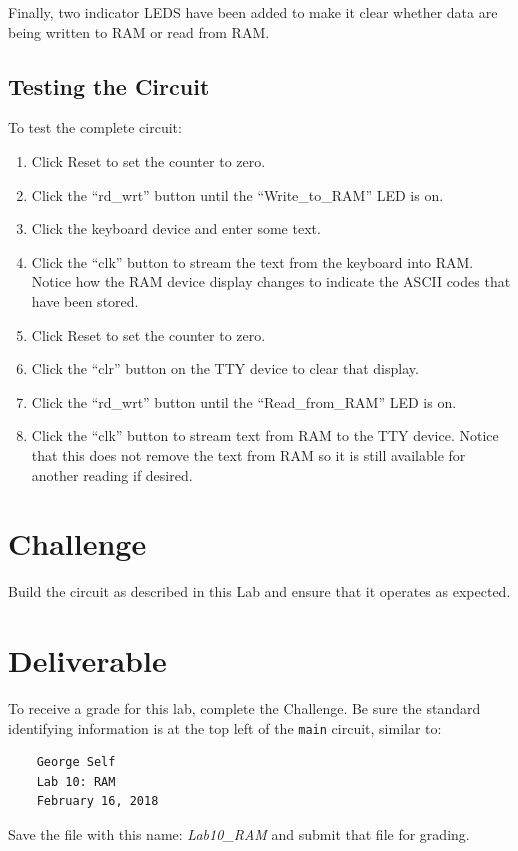 Finally, two indicator LEDS have been added to make it clear whether data are being written to RAM or read from RAM.

\subsection{Testing the Circuit}

To test the complete circuit:

\begin{enumerate}
	\item Click Reset to set the counter to zero.
	\item Click the ``rd\_wrt'' button until the ``Write\_to\_RAM'' LED is on.
	\item Click the keyboard device and enter some text.
	\item Click the ``clk'' button to stream the text from the keyboard into RAM. Notice how the RAM device display changes to indicate the ASCII codes that have been stored.
	\item Click Reset to set the counter to zero.
	\item Click the ``clr'' button on the TTY device to clear that display.
	\item Click the ``rd\_wrt'' button until the ``Read\_from\_RAM'' LED is on.
	\item Click the ``clk'' button to stream text from RAM to the TTY device. Notice that this does not remove the text from RAM so it is still available for another reading if desired.
\end{enumerate}

\section{Challenge}

Build the circuit as described in this Lab and ensure that it operates as expected.

\section{Deliverable}

To receive a grade for this lab, complete the Challenge. Be sure the standard identifying information is at the top left of the \lstinline{main} circuit, similar to: 

\bigskip
\begin{minipage}{\linewidth}
	\begin{verbatim}
	George Self
	Lab 10: RAM
	February 16, 2018
	\end{verbatim}
\end{minipage}
\bigskip

Save the file with this name: \textit{Lab10\_RAM} and submit that file for grading.
